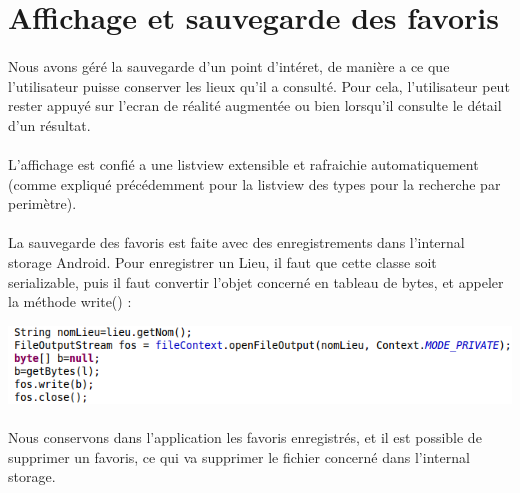 \section*{Affichage et sauvegarde des favoris}

\paragraph{}
Nous avons géré la sauvegarde d'un point d'intéret, de manière a ce que l'utilisateur puisse conserver les lieux qu'il a consulté. Pour cela, l'utilisateur peut rester appuyé sur l'ecran de réalité augmentée ou bien lorsqu'il consulte le détail d'un résultat.
\paragraph{}
L'affichage est confié a une listview extensible et rafraichie automatiquement (comme expliqué précédemment pour la listview des types pour la recherche par perimètre). 
\paragraph{}
La sauvegarde des favoris est faite avec des enregistrements dans l'internal storage Android.
Pour enregistrer un Lieu, il faut que cette classe soit serializable, puis il faut convertir l'objet concerné en tableau de bytes, et appeler la méthode write() :

\begin{center}
	\includegraphics[width=140mm]{images/fichier.png}
\end{center}


\paragraph{}
Nous conservons dans l'application les favoris enregistrés, et il est possible de supprimer un favoris, ce qui va supprimer le fichier concerné dans l'internal storage.
